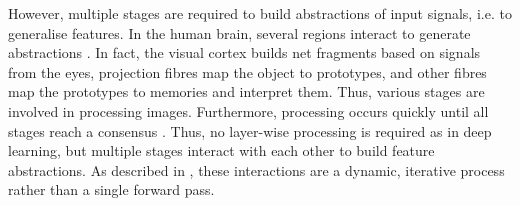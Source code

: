 However, multiple stages are required to build abstractions of input signals, i.e. to generalise features.
In the human brain, several regions interact to generate abstractions .
In fact, the visual cortex builds net fragments based on signals from the eyes, projection fibres map the object to prototypes, and other fibres map the prototypes to memories and interpret them. Thus, various stages are involved in processing images.
Furthermore, processing occurs quickly until all stages reach a consensus . Thus, no layer-wise processing is required as in deep learning, but multiple stages interact with each other to build feature abstractions. As described in , these interactions are a dynamic, iterative process rather than a single forward pass.

